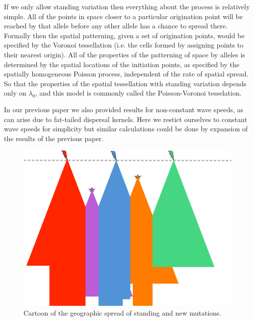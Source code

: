 \documentclass{article}
\begin{document}
If we only allow standing variation then everything about the process
is relatively simple. All of the
points in space closer to a particular origination point will be
reached by that allele before any other
allele has a chance to spread there. Formally then the spatial patterning,
given a set of origination points, would be specified by the Voronoi
tessellation (i.e. the cells formed by assigning points to their
nearest origin). All of the properties of the patterning of space by alleles is
determined by the spatial locations of the initiation points, as
specified by the spatially homogeneous Poisson process, independent of
the rate of spatial spread. So that the properties
of the spatial tessellation with standing variation depends only on
$\lambda_0$, and this
model is commonly called the Poisson-Voronoi tesselation.

In our previous paper \citep{ralph2010parallel} we also provided results for non-constant wave
speeds, as can arise due to fat-tailed dispersal kernels. Here we
restict ourselves to constant wave speeds for simplicity but similar
calculations could be done by expansion of the results of the previous paper. 

\begin{figure}[ht]
  \begin{center}
    \includegraphics{spreading_alleles_trimmed}
  \end{center}
  \caption{
Cartoon of the geographic spread of standing and new mutations. 
}
  \label{fig:cartoon}
  
\end{figure}
\end{document}
